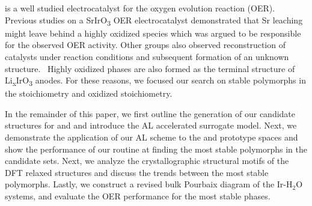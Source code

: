 is a well studied electrocatalyst for the oxygen evolution reaction (OER).
\cite{Seitz2016,Lee2012a,McCrory2015,Trotochaud2012,Danilovic2014,Carmo2013,Miles1978,Beni1979}
%
Previous studies on a SrIrO\textsubscript{3} OER electrocatalyst demonstrated that Sr leaching might leave behind a highly oxidized  species which was argued to be responsible for the observed OER activity.
\cite{Seitz2016}
%
Other groups also observed reconstruction of \IrOx catalysts under reaction conditions and subsequent formation of an unknown structure.~\cite{Pearce2017}
%
Highly oxidized \IrOthree phases are also formed as the terminal structure of Li\textsubscript{x}IrO\textsubscript{3} anodes.\cite{Pearce2017}
%
For these reasons, we focused our search on stable polymorphs in the \IrOtwo stoichiometry and  oxidized \IrOthree stoichiometry.
%
%


%
%
In the remainder of this paper, we first outline the generation of our candidate structures for \IrOtwo and \IrOthree and introduce the AL accelerated surrogate model.
%
Next, we demonstrate the application of our AL scheme to the \IrOtwo and \IrOthree prototype spaces and show the performance of our routine at finding the most stable polymorphs in the candidate sets.
%
Next, we analyze the crystallographic structural motifs of the DFT relaxed structures and discuss the trends between the most stable polymorphs.
%
Lastly, we construct a revised bulk Pourbaix diagram of the Ir-H$_2$O systems, and evaluate the OER performance for the most stable phases.
%
